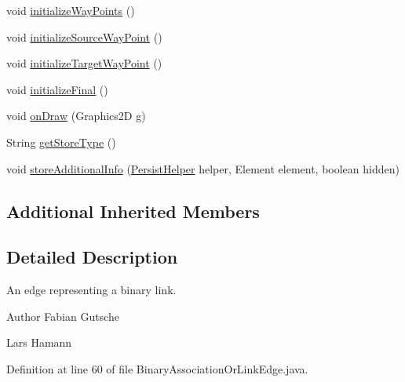 \begin{DoxyCompactItemize}
\item 
void \hyperlink{classorg_1_1tzi_1_1use_1_1gui_1_1views_1_1diagrams_1_1elements_1_1edges_1_1_binary_association_or_link_edge_abb2fa0dc24dc28eee5128e7bad4f9866}{initialize\-Way\-Points} ()
\item 
void \hyperlink{classorg_1_1tzi_1_1use_1_1gui_1_1views_1_1diagrams_1_1elements_1_1edges_1_1_binary_association_or_link_edge_af06c23e79fb3a548c4f9da6d96bfce56}{initialize\-Source\-Way\-Point} ()
\item 
void \hyperlink{classorg_1_1tzi_1_1use_1_1gui_1_1views_1_1diagrams_1_1elements_1_1edges_1_1_binary_association_or_link_edge_a4adba7cba55370a0b34c1a696da877ce}{initialize\-Target\-Way\-Point} ()
\item 
void \hyperlink{classorg_1_1tzi_1_1use_1_1gui_1_1views_1_1diagrams_1_1elements_1_1edges_1_1_binary_association_or_link_edge_a3e558a4284ac17845dd288e664378214}{initialize\-Final} ()
\item 
void \hyperlink{classorg_1_1tzi_1_1use_1_1gui_1_1views_1_1diagrams_1_1elements_1_1edges_1_1_binary_association_or_link_edge_ab74a5030f906893f074c03c28e9bc6df}{on\-Draw} (Graphics2\-D g)
\item 
String \hyperlink{classorg_1_1tzi_1_1use_1_1gui_1_1views_1_1diagrams_1_1elements_1_1edges_1_1_binary_association_or_link_edge_abe9c06d6a3e0a3b9407ef8e1c39cc9cd}{get\-Store\-Type} ()
\item 
void \hyperlink{classorg_1_1tzi_1_1use_1_1gui_1_1views_1_1diagrams_1_1elements_1_1edges_1_1_binary_association_or_link_edge_a198c77c8e97589fee966328bce08f253}{store\-Additional\-Info} (\hyperlink{classorg_1_1tzi_1_1use_1_1gui_1_1util_1_1_persist_helper}{Persist\-Helper} helper, Element element, boolean hidden)
\end{DoxyCompactItemize}
\subsection*{Additional Inherited Members}


\subsection{Detailed Description}
An edge representing a binary link.

\begin{DoxyAuthor}{Author}
Fabian Gutsche 

Lars Hamann 
\end{DoxyAuthor}


Definition at line 60 of file Binary\-Association\-Or\-Link\-Edge.\-java.



